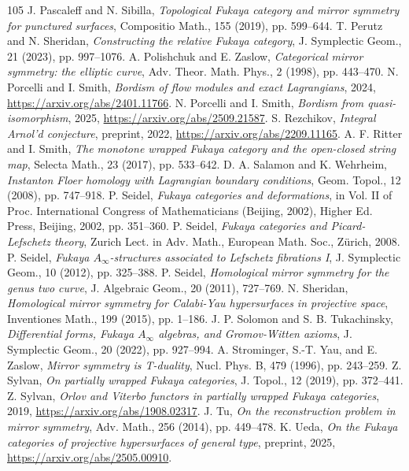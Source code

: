 \documentclass[UTF8,a4paper,11pt,fontset=windows]{ctexart}
\theoremstyle{cnthm}
\numberwithin{equation}{section}
\begin{document}
\begin{thebibliography}{105}
 J. Pascaleff and N. Sibilla, \emph{Topological Fukaya category and mirror symmetry for punctured surfaces}, Compositio Math., 155 (2019), pp. 599--644.
 T. Perutz and N. Sheridan, \emph{Constructing the relative Fukaya category}, J. Symplectic Geom., 21 (2023), pp. 997--1076.
 A. Polishchuk and E. Zaslow, \emph{Categorical mirror symmetry: the elliptic curve}, Adv. Theor. Math. Phys., 2 (1998), pp. 443--470.
 N. Porcelli and I. Smith, \emph{Bordism of flow modules and exact Lagrangians}, 2024, \url{https://arxiv.org/abs/2401.11766}.
 N. Porcelli and I. Smith, \emph{Bordism from quasi-isomorphism}, 2025, \url{https://arxiv.org/abs/2509.21587}.
 S. Rezchikov, \emph{Integral Arnol'd conjecture}, preprint, 2022, \url{https://arxiv.org/abs/2209.11165}.
 A. F. Ritter and I. Smith, \emph{The monotone wrapped Fukaya category and the open-closed string map}, Selecta Math., 23 (2017), pp. 533--642.
 D. A. Salamon and K. Wehrheim, \emph{Instanton Floer homology with Lagrangian boundary conditions}, Geom. Topol., 12 (2008), pp. 747--918.
 P. Seidel, \emph{Fukaya categories and deformations}, in Vol. II of Proc. International Congress of Mathematicians (Beijing, 2002), Higher Ed. Press, Beijing, 2002, pp. 351--360.
 P. Seidel, \emph{Fukaya categories and Picard-Lefschetz theory}, Zurich Lect. in Adv. Math., European Math. Soc., Z\"urich, 2008.
 P. Seidel, \emph{Fukaya $A_\infty$-structures associated to Lefschetz fibrations I}, J. Symplectic Geom., 10 (2012), pp. 325--388.
 P. Seidel, \emph{Homological mirror symmetry for the genus two curve}, J. Algebraic Geom., 20 (2011), 727--769.
 N. Sheridan, \emph{Homological mirror symmetry for Calabi-Yau hypersurfaces in projective space}, Inventiones Math., 199 (2015), pp. 1--186.
 J. P. Solomon and S. B. Tukachinsky, \emph{Differential forms, Fukaya $A_\infty$ algebras, and Gromov-Witten axioms}, J. Symplectic Geom., 20 (2022), pp. 927--994.
 A. Strominger, S.-T. Yau, and E. Zaslow, \emph{Mirror symmetry is T-duality}, Nucl. Phys. B, 479 (1996), pp. 243--259.
 Z. Sylvan, \emph{On partially wrapped Fukaya categories}, J. Topol., 12 (2019), pp. 372--441.
 Z. Sylvan, \emph{Orlov and Viterbo functors in partially wrapped Fukaya categories}, 2019, \url{https://arxiv.org/abs/1908.02317}.
 J. Tu, \emph{On the reconstruction problem in mirror symmetry}, Adv. Math., 256 (2014), pp. 449--478.
 K. Ueda, \emph{On the Fukaya categories of projective hypersurfaces of general type}, preprint, 2025, \url{https://arxiv.org/abs/2505.00910}.

\end{thebibliography}
\end{document}
